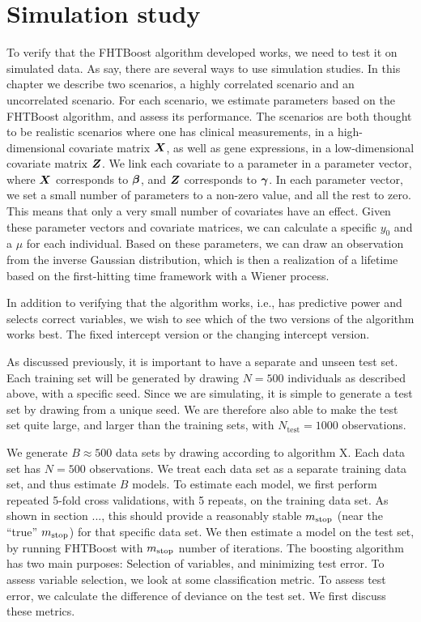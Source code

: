\chapter{Simulation study}
To verify that the FHTBoost algorithm developed works, we need to test it on simulated data.
As \citet{simulation-studies} say, there are several ways to use simulation studies.
In this chapter we describe two scenarios, a highly correlated scenario and an uncorrelated scenario. 
For each scenario, we estimate parameters based on the FHTBoost algorithm, and assess its performance.
The scenarios are both thought to be realistic scenarios where one has clinical measurements, in a high-dimensional covariate matrix $\bm{X}$, as well as gene expressions,
in a low-dimensional covariate matrix $\bm{Z}$.
We link each covariate to a parameter in a parameter vector, where $\bm{X}$ corresponds to $\boldsymbol{\beta}$, and $\bm{Z}$ corresponds to $\boldsymbol{\gamma}$.
In each parameter vector, we set a small number of parameters to a non-zero value, and all the rest to zero.
This means that only a very small number of covariates have an effect.
Given these parameter vectors and covariate matrices, we can calculate a specific $y_0$ and a $\mu$ for each individual.
Based on these parameters, we can draw an observation from the inverse Gaussian distribution, which is then a realization of a lifetime based on the first-hitting time framework with a Wiener process.

In addition to verifying that the algorithm works, i.e., has predictive power and selects correct variables, we wish to see which of the two versions of the algorithm works best.
The fixed intercept version or the changing intercept version.

As discussed previously, it is important to have a separate and unseen test set.
Each training set will be generated by drawing $N=500$ individuals as described above, with a specific seed.
Since we are simulating, it is simple to generate a test set by drawing from a unique seed.
We are therefore also able to make the test set quite large, and larger than the training sets, with $N_{\text{test}}=1000$ observations.

We generate $B\approx500$ data sets by drawing according to algorithm X. Each data set has $N=500$ observations. 
We treat each data set as a separate training data set, and thus estimate $B$ models.
To estimate each model, we first perform repeated 5-fold cross validations, with 5 repeats, on the training data set.
As shown in section ..., this should provide a reasonably stable $m_{\text{stop}}$ (near the ``true'' $m_{\text{stop}}$) for that specific data set.
We then estimate a model on the test set, by running FHTBoost with $m_{\text{stop}}$ number of iterations.
The boosting algorithm has two main purposes: Selection of variables, and minimizing test error.
To assess variable selection, we look at some classification metric.
To assess test error, we calculate the difference of deviance on the test set.
We first discuss these metrics.

